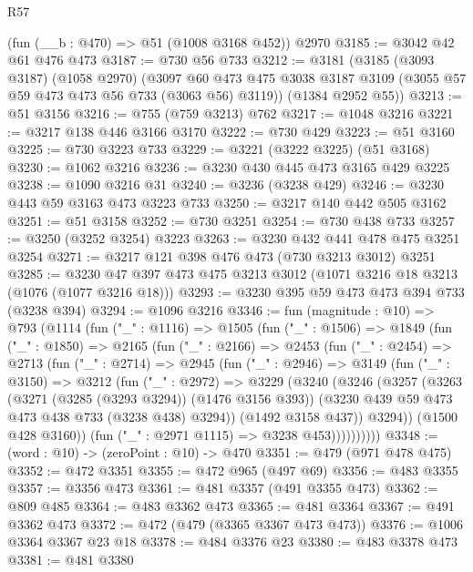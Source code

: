 \begin{lexlean}{R57}
\begin{coremodule}
    (fun (__b : @470) => @51 (@1008 @3168 @452))
    @2970
@3185 := @3042 @42 @61 @476 @473
@3187 := @730 @56 @733
@3212 := @3181
    (@3185
      (@3093 @3187)
      (@1058 @2970)
      (@3097 @60 @473 @475 @3038 @3187 @3109 (@3055 @57 @59 @473 @473 @56 @733 (@3063 @56) @3119))
      (@1384 @2952 @55))
@3213 := @51 @3156
@3216 := @755 (@759 @3213) @762
@3217 := @1048 @3216
@3221 := @3217 @138 @446 @3166 @3170
@3222 := @730 @429
@3223 := @51 @3160
@3225 := @730 @3223 @733
@3229 := @3221 (@3222 @3225) (@51 @3168)
@3230 := @1062 @3216
@3236 := @3230 @430 @445 @473 @3165 @429 @3225
@3238 := @1090 @3216 @31
@3240 := @3236 (@3238 @429)
@3246 := @3230 @443 @59 @3163 @473 @3223 @733
@3250 := @3217 @140 @442 @505 @3162
@3251 := @51 @3158
@3252 := @730 @3251
@3254 := @730 @438 @733
@3257 := @3250 (@3252 @3254) @3223
@3263 := @3230 @432 @441 @478 @475 @3251 @3254
@3271 := @3217 @121 @398 @476 @473 (@730 @3213 @3012) @3251
@3285 := @3230 @47 @397 @473 @475 @3213 @3012 (@1071 @3216 @18 @3213 (@1076 (@1077 @3216 @18)))
@3293 := @3230 @395 @59 @473 @473 @394 @733 (@3238 @394)
@3294 := @1096 @3216
@3346 := fun (magnitude : @10) =>
  @793
    (@1114
      (fun ("_" : @1116) =>
      @1505
        (fun ("_" : @1506) =>
        @1849
          (fun ("_" : @1850) =>
          @2165
            (fun ("_" : @2166) =>
            @2453
              (fun ("_" : @2454) =>
              @2713
                (fun ("_" : @2714) =>
                @2945
                  (fun ("_" : @2946) =>
                  @3149
                    (fun ("_" : @3150) =>
                    @3212
                      (fun ("_" : @2972) =>
                      @3229
                        (@3240
                          (@3246
                            (@3257
                              (@3263
                                (@3271 (@3285 (@3293 @3294)) (@1476 @3156 @393))
                                (@3230 @439 @59 @473 @473 @438 @733 (@3238 @438) @3294))
                              (@1492 @3158 @437))
                            @3294))
                        (@1500 @428 @3160))
                      (fun ("_" : @2971 @1115) => @3238 @453))))))))))
@3348 := (word : @10) -> (zeroPoint : @10) -> @470
@3351 := @479 (@971 @478 @475)
@3352 := @472 @3351
@3355 := @472 @965 (@497 @69)
@3356 := @483 @3355
@3357 := @3356 @473
@3361 := @481 @3357 (@491 @3355 @473)
@3362 := @809 @485
@3364 := @483 @3362 @473
@3365 := @481 @3364
@3367 := @491 @3362 @473
@3372 := @472 (@479 (@3365 @3367 @473 @473))
@3376 := @1006 @3364 @3367 @23 @18
@3378 := @484 @3376 @23
@3380 := @483 @3378 @473
@3381 := @481 @3380

\end{coremodule}
\end{lexlean}

